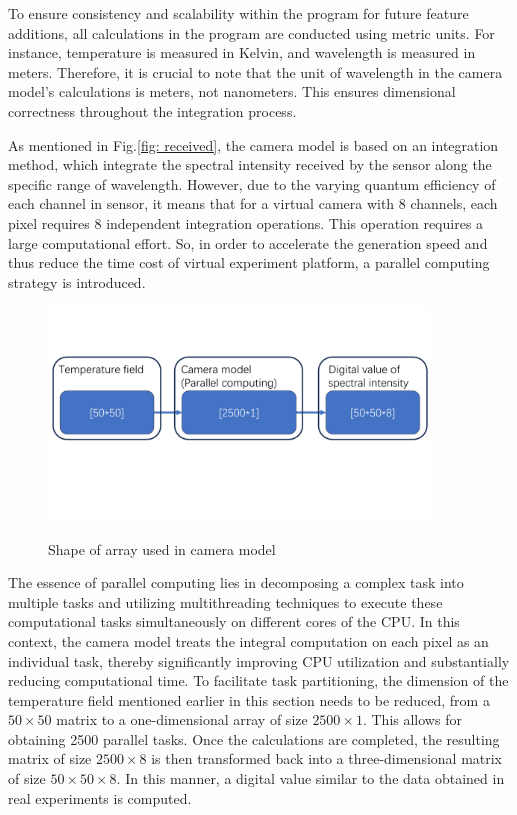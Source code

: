 To ensure consistency and scalability within the program for future feature 
additions, all calculations in the program are conducted using metric units. 
For instance, temperature is measured in Kelvin, and wavelength is measured in 
meters. Therefore, it is crucial to note that the unit of wavelength in the camera 
model's calculations is meters, not nanometers. This ensures dimensional 
correctness throughout the integration process.


As mentioned in Fig.\ref{fig: received}, the camera model is based on an integration 
method, which integrate the spectral intensity received by the sensor along the 
specific range of wavelength. However, due to the varying quantum 
efficiency of each channel in sensor, it means that for a virtual camera 
with 8 channels, each pixel requires 8 independent integration operations. 
This operation requires a large computational effort. So, in order to 
accelerate the generation speed and thus reduce the time cost of virtual 
experiment platform, a parallel computing strategy is introduced.


\begin{figure}[htbp]
  \centering
  \includegraphics[width=0.9\textwidth]{figures/reshape.pdf}
  \label{fig: reshape}
  \caption{Shape of array used in camera model}
\end{figure}


The essence of parallel computing lies in decomposing a complex task into 
multiple tasks and utilizing multithreading techniques to execute these 
computational tasks simultaneously on different cores of the CPU. In 
this context, the camera model treats the integral computation on each pixel as an 
individual task, thereby significantly improving CPU utilization and substantially 
reducing computational time\cite{Asanovic.2009}. To facilitate task partitioning, the 
dimension of the temperature field 
mentioned earlier in this section needs to be reduced, from 
a $50\times 50$ matrix to a one-dimensional array of size $2500\times1$. This allows for 
obtaining 2500 parallel tasks. Once the calculations are completed, the 
resulting matrix of size $2500\times8$ is then transformed back into a three-dimensional 
matrix of size $50\times50\times8$. In this manner, a digital value similar to the data 
obtained in real experiments is computed.


